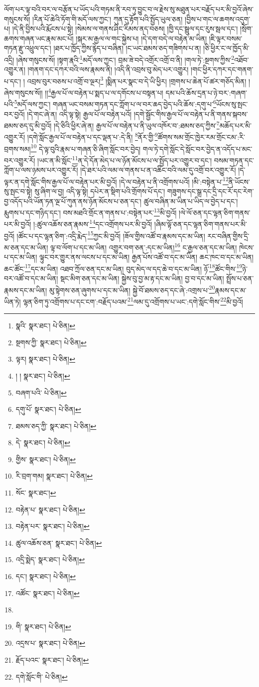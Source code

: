 ལོག་པར་ལྟ་བའི་བར་ལ་བརྩོན་པ་ཡོད་པའི་གཏམ་ནི་རབ་ཏུ་བྱུང་བ་ལ་རྗེས་སུ་མཐུན་པར་བརྗོད་པར་མི་བྱའོ་ཞེས་གསུངས་སོ། །རིན་པོ་ཆེའི་ཏོག་གི་མདོ་ལས་ཀྱང་། ཀུན་དུ་རྟོག་པའི་སྤྱོད་ཡུལ་ཅན། །བྱིས་པ་གང་ལ་ཆགས་འདུག་པ། །དེ་ནི་བྱིས་པའི་རྨོངས་པ་སྟེ། །སེམས་ལ་གནས་ཤིང་རིམས་ནད་བཅས། །ཁྱི་དང་སྦྲུལ་དང་རུས་སྦལ་དང་། །སྲོག་ཆགས་གཞན་ཡང་རྣམ་མང་པོ། །སྐར་མ་རྒྱལ་ལ་གང་སྐྱེས་པ། །དེ་དག་བདེ་ལ་བརྟེན་མ་ཡིན། །ཇི་ལྟར་བསམ་གཏན་རྫུ་འཕྲུལ་དང་། །ཐར་པ་ཁྱོད་ཀྱིས་རྙེད་པ་བཞིན། །ང་ཡང་ཐམས་ཅད་གཟིགས་པ་ན། །ཅི་ཕྱིར་ང་ལ་ཁྱོད་མི་འདྲི། །ཞེས་གསུངས་སོ། །སྟག་རྣའི་\footnote{སྣའི་  སྣར་ཐང་།  པེ་ཅིན། }མདོ་ལས་ཀྱང་། བྲམ་ཟེ་བདེ་འགྲོར་འགྲོ་བ་ནི། །གལ་ཏེ་:སྔགས་ཀྱིས་\footnote{སྔགས་ཀྱི་  སྣར་ཐང་།  པེ་ཅིན། }འཐོབ་འགྱུར་ན། །གནག་དང་དཀར་བའི་ལས་རྣམས་ནི། །འདི་ནི་འབྲས་བུ་མེད་པར་འགྱུར། །གང་ཕྱིར་དཀར་དང་གནག་པ་དང་། །
འབྲས་བུར་བཅས་པ་འགྲོ་བ་ལྔར།\footnote{ལྟར།  སྣར་ཐང་།  པེ་ཅིན། } །སྨིན་པར་སྣང་བ་དེ་ཡི་ཕྱིར། །གྲགས་པ་ཆེན་པོ་ཚར་གཅོད་མིན། །ཞེས་གསུངས་སོ།། །།\footnote{། །  སྣར་ཐང་།  པེ་ཅིན། }རྒྱལ་པོ་ལ་བརྟེན་པ་སྨད་པ་ལ་དགོངས་པ་བསྟན་པ། དམ་པའི་ཆོས་དྲན་པ་ཉེ་བར་:གཞག་པའི་\footnote{བཞག་པའི་  པེ་ཅིན། }མདོ་ལས་ཀྱང་། གཞན་ཡང་བསམ་གཏན་དང་ཀློག་པ་ལ་བར་ཆད་བྱེད་པའི་ཆོས་:དགུ་པ་\footnote{དགུ་པོ་  སྣར་ཐང་།  པེ་ཅིན། }ཡོངས་སུ་སྤང་བར་བྱའོ། །དེ་གང་ཞེ་ན། འདི་ལྟ་སྟེ། རྒྱལ་པོ་ལ་བརྟེན་པའོ། །དགེ་སྦྱོང་གིས་རྒྱལ་པོ་ལ་བརྟེན་པ་ནི་གནས་སྐབས་ཐམས་ཅད་དུ་མི་བྱའོ། །དེ་ཅིའི་ཕྱིར་ཞེ་ན། རྒྱལ་པོ་ལ་བརྟེན་པ་ནི་ཡུལ་འཁོར་བ་:ཐམས་ཅད་ཀྱིས་\footnote{ཐམས་ཅད་ཀྱི་  སྣར་ཐང་།  པེ་ཅིན། }མཆོད་པར་མི་འགྱུར་རོ། །དགེ་སློང་རྒྱལ་པོ་ལ་བརྟེན་པ་དང་ལྡན་པ་:དེ་ནི། \footnote{དེ་  སྣར་ཐང་།  པེ་ཅིན། }ནོར་གྱི་\footnote{གྱིས་  སྣར་ཐང་།  པེ་ཅིན། }ཚོགས་སམ་གྲོང་ཁྱེར་རམ་གྲོང་ངམ་:རི་བྲགས་སམ།\footnote{རི་བྲག་གམ།  སྣར་ཐང་།  པེ་ཅིན། } དེ་ལྟ་བུའི་རྣམ་པ་གཞན་ཅི་ཞིག་སློང་བར་བྱེད། གལ་ཏེ་དགེ་སློང་དེ་སློང་བར་བྱེད་ན་འདོད་པ་མང་བར་འགྱུར་རོ། །ཡང་ན་མི་སློང་\footnote{སོང་  སྣར་ཐང་། }ན་དེ་དོན་མེད་པ་ལ་ཉོན་མོངས་པ་ལ་སྤྱོད་པར་འགྱུར་བ་དང་། བསམ་གཏན་དང་ཀློག་པ་ལས་ཉམས་པར་འགྱུར་རོ། །དེ་ཐར་པའི་ལམ་ལ་གནས་པ་ན་འཆིང་བའི་ལམ་དུ་འགྲོ་བར་འགྱུར་རོ། །དེ་ལྟར་ན་དགེ་སློང་གིས་རྒྱལ་པོ་ལ་བརྟེན་པར་མི་བྱའོ། །དེ་ལ་བརྟེན་པ་ནི་འགྲོགས་པའོ། །མི་:བསྟེན་པ་\footnote{བརྟེན་པ་  སྣར་ཐང་།  པེ་ཅིན། }ནི་ཡོངས་སུ་སྤང་བ་སྟེ། སུ་ཞིག་ལ་བྱ། འདི་ལྟ་སྟེ། དཔེར་ན་སྡིག་པའི་གྲོགས་པོ་དང་། གཟུགས་དང་སྒྲ་དང་དྲི་དང་རོ་དང་རེག་བྱ་འདོད་པའི་ཡོན་ཏན་ལྔ་པོ་ཀུན་ནས་ཉོན་མོངས་པ་ཅན་དང་། ཚུལ་བཞིན་མ་ཡིན་པ་ཡིད་ལ་བྱེད་པ་དང་། རྨུགས་པ་དང་གཉིད་དང་། བས་མཐའི་གྲོང་ན་གནས་པ་:བསྟེན་པར་\footnote{བརྟེན་པར་  སྣར་ཐང་།  པེ་ཅིན། }མི་བྱའོ། །ལེ་ལོ་ཅན་དང་ལྷན་ཅིག་གནས་པར་མི་བྱའོ། །:ཚུལ་འཆོས་ཅན་རྣམས་\footnote{ཚུལ་འཆོས་ཅན་  སྣར་ཐང་།  པེ་ཅིན། }དང་འགྲོགས་པར་མི་བྱའོ། །ཞིམ་ལྟོ་ཅན་དང་ལྷན་ཅིག་གནས་པར་མི་བྱའོ། །ཚོང་པ་དང་ལྷན་ཅིག་:འདྲི་རྨེད་\footnote{འདྲི་སྨེད་  སྣར་ཐང་།  པེ་ཅིན། }ཀྱང་མི་བྱའོ། །ཟོལ་གྱིས་འཚོ་བ་རྣམས་དང་མ་ཡིན། རང་བཞིན་གྱིས་དྲི་མ་ཅན་དང་མ་ཡིན། ལྟ་བ་ལོག་པ་དང་མ་ཡིན། འགྱུར་བག་ཅན་:དང་མ་ཡིན།\footnote{དང་།  སྣར་ཐང་།  པེ་ཅིན། } ང་རྒྱལ་ཅན་དང་མ་ཡིན། ཁེངས་པ་དང་མ་ཡིན། ལྟུང་བར་གྱུར་ནས་ལངས་པ་དང་མ་ཡིན། རྒྱན་པོས་འཚོ་བ་དང་མ་ཡིན། ཆང་ཁང་བ་དང་མ་ཡིན། ཆང་ཚོང་\footnote{འཚོང་  སྣར་ཐང་།  པེ་ཅིན། }དང་མ་ཡིན། འཐབ་ཀྲོལ་ཅན་དང་མ་ཡིན། བུད་མེད་ལ་དད་ཆེ་བ་དང་མ་ཡིན། ཉོ་\footnote{}ཚོང་གིས་\footnote{གི་  སྣར་ཐང་།  པེ་ཅིན། }ཉེ་བར་འཚོ་བ་དང་མ་ཡིན། སྡང་མིག་ཅན་དང་མ་ཡིན། སྐྱེས་བུ་བྱ་མ་རྟ་དང་མ་ཡིན། བྱ་བ་དང་མ་ཡིན། སྤྲོས་པ་ཅན་རྣམས་དང་མ་ཡིན། མུ་སྟེགས་ཅན་ཞུགས་པ་དང་མ་ཡིན། སྐྱེ་བོ་ཐམས་ཅད་དང་ཞེ་:འགྲས་པ་\footnote{འདྲས་པ་  སྣར་ཐང་།  པེ་ཅིན། }རྣམས་དང་མ་ཡིན་ཏེ། ལྷན་ཅིག་ཏུ་འགྲོགས་པ་དང་ངག་:བརྗོད་པའམ་\footnote{རྗོད་པའང་  སྣར་ཐང་།  པེ་ཅིན། }ལམ་དུ་འགྲོགས་པ་ཡང་:དགེ་སློང་གིས་\footnote{དགེ་སློང་གི་  པེ་ཅིན། }མི་བྱའོ། 